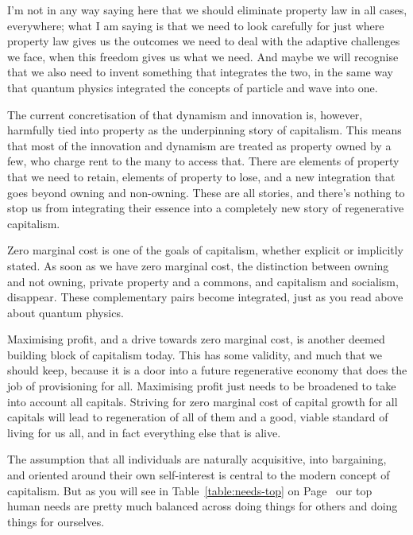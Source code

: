 I'm not in any way saying here that we should eliminate property law in all cases, everywhere; what I am saying is that we need to look carefully for just where property law gives us the outcomes we need to deal with the adaptive challenges we face, when this freedom gives us what we need. And maybe we will recognise that we also need to invent something that integrates the two, in the same way that quantum physics integrated the concepts of particle and wave into one.


The current concretisation of that dynamism and innovation is, however, harmfully tied into property as the underpinning story of capitalism. This means that most of the innovation and dynamism are treated as property owned by a few, who charge rent to the many to access that. There are elements of property that we need to retain, elements of property to lose, and a new integration that goes beyond owning and non-owning. These are all stories, and there's nothing to stop us from integrating their essence into a completely new story of regenerative capitalism.


Zero marginal cost is one of the goals of capitalism, whether explicit or implicitly stated. As soon as we have zero marginal cost, the distinction between owning and not owning, private property and a commons, and capitalism and socialism, disappear. These complementary pairs become integrated, just as you read above about quantum physics.


Maximising profit, and a drive towards zero marginal cost, is another deemed building block of capitalism today. This has some validity, and much that we should keep,  because it is a door into a future regenerative economy that does the job of provisioning for all. Maximising profit just needs to be broadened to take into account all capitals. Striving for zero marginal cost of capital growth for all capitals will lead to regeneration of all of them and a good, viable standard of living for us all, and in fact everything else that is alive.


The assumption that all individuals are naturally acquisitive, into bargaining, and oriented around their own self-interest is central to the modern concept of capitalism. But as you will see in Table~\ref{table:needs-top} on Page~\pageref{table:needs-top}  our top human needs are pretty much balanced across doing things for others and doing things for ourselves. 


